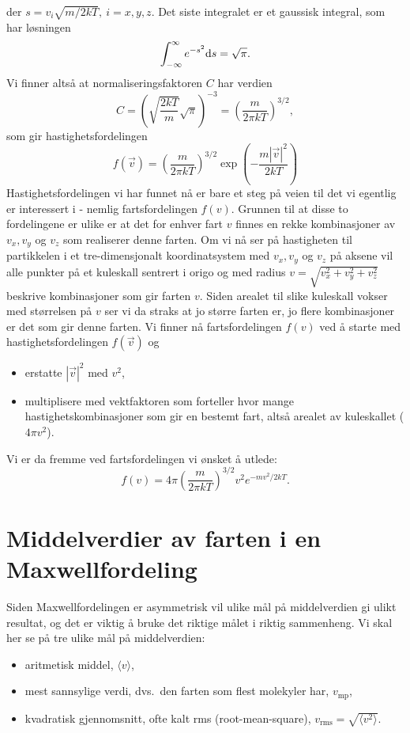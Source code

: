 der $s = v_i\sqrt{m/2kT},~i = {x,y,z}$. Det siste integralet er et gaussisk integral, som har løsningen
\begin{displaymath}
	\int_{-\infty}^\infty e^{-s^2} \text{d} s  = \sqrt{\pi}.
\end{displaymath}
Vi finner altså at normaliseringsfaktoren $C$ har verdien
\begin{displaymath}
	C =  \left(\sqrt{\frac{2kT}{m}}\sqrt{\pi}\right)^{-3} = \left(\frac{m}{2\pi kT}\right)^{3/2},
\end{displaymath}
som gir hastighetsfordelingen
\begin{displaymath}
	f(\vec{v}) = \left(\frac{m}{2\pi kT}\right)^{3/2}\exp\left(-\frac{m|\vec{v}|^2}{2kT}\right) 
\end{displaymath}
Hastighetsfordelingen vi har funnet nå er bare et steg på veien til det vi egentlig er interessert i - nemlig fartsfordelingen $f(v)$. Grunnen til at disse to fordelingene er ulike er at det for enhver fart $v$ finnes en rekke kombinasjoner av $v_x, v_y$ og $v_z$ som realiserer denne farten. Om vi nå ser på hastigheten til partikkelen i et tre-dimensjonalt koordinatsystem med $v_x, v_y$ og $v_z$ på aksene vil alle punkter på et kuleskall sentrert i origo og med radius $v = \sqrt{v_x^2+v_y^2 + v_z^2}$ beskrive kombinasjoner som gir farten $v$. Siden arealet til slike kuleskall vokser med størrelsen på $v$ ser vi da straks at jo større farten er, jo flere kombinasjoner er det som gir denne farten. Vi finner nå fartsfordelingen $f(v)$ ved å starte med hastighetsfordelingen $f(\vec{v})$ og
\begin{itemize}
	\item
	erstatte $|\vec{v}|^2$ med $v^2$,
	\item
	multiplisere med vektfaktoren som forteller hvor mange hastighetskombinasjoner som gir en bestemt fart, altså arealet av kuleskallet ($4\pi v^2$).
\end{itemize}
Vi er da fremme ved fartsfordelingen vi ønsket å utlede:
\begin{displaymath}
	f(v) = 4\pi\left(\frac{m}{2\pi kT}\right)^{3/2} v^2 e^{-mv^2/2kT}.
\end{displaymath}



\section{Middelverdier av farten i en Maxwellfordeling}
\label{apx:maxwellfordeling:middel}
Siden Maxwellfordelingen er asymmetrisk vil ulike mål på middelverdien gi ulikt resultat, og det er viktig å bruke det riktige målet i riktig sammenheng. Vi skal her se på tre ulike mål på middelverdien:
\begin{itemize}
	\item
	aritmetisk middel, $\langle v \rangle$,
	\item
	mest sannsylige verdi, dvs.~den farten som flest molekyler har, $v_\text{mp}$,
	\item
	kvadratisk gjennomsnitt, ofte kalt rms (root-mean-square), $v_\text{rms} = \sqrt{\langle v^2 \rangle}$.
\end{itemize}

